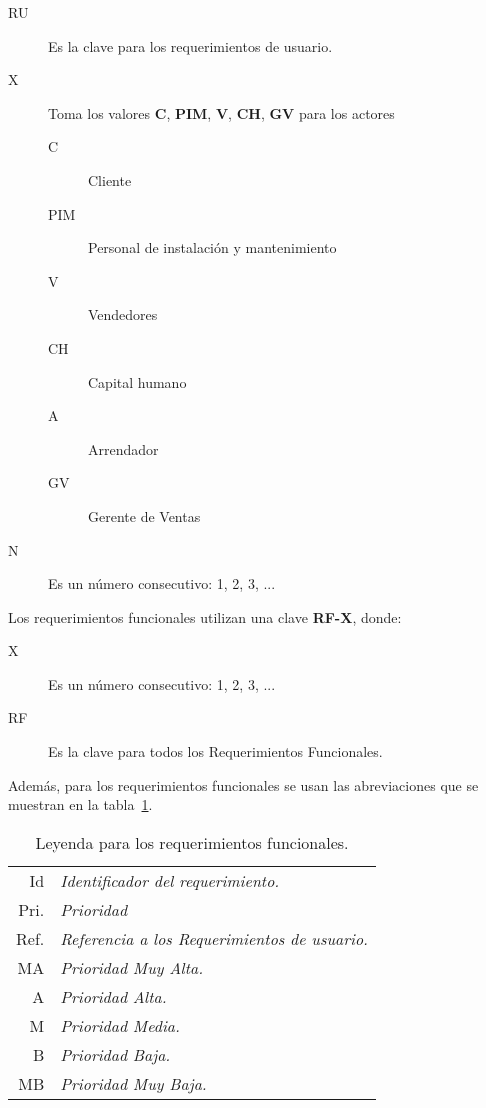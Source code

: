 \begin{description}
    \item[RU] Es la clave para los requerimientos de usuario.
	\item[X] Toma los valores \textbf{C}, \textbf{PIM}, \textbf{V}, \textbf{CH}, \textbf{GV} para los actores
	\begin{description}
	    \item[C] Cliente
	    \item[PIM] Personal de instalación y mantenimiento
	    \item[V] Vendedores
	    \item[CH] Capital humano
	    \item[A] Arrendador
	     \item[GV] Gerente de Ventas
	\end{description}
	\item[N] Es un número consecutivo: 1, 2, 3, ...
\end{description}
Los requerimientos funcionales utilizan una clave \textbf{RF-X}, donde:
\begin{description}
    \item[X] Es un número consecutivo: 1, 2, 3, ...
    \item[RF] Es la clave para todos los Requerimientos Funcionales.
\end{description}
	Además, para los requerimientos funcionales se usan las abreviaciones que se muestran en la tabla~\ref{tbl:leyendaRF}.
\begin{table}[hbtp!]
	\begin{center}
    \begin{tabular}{|r l|}
	    \hline
    	{\footnotesize Id} & {\footnotesize\em Identificador del requerimiento.}\\
    	{\footnotesize Pri.} & {\footnotesize\em Prioridad}\\
    	{\footnotesize Ref.} & {\footnotesize\em Referencia a los Requerimientos de usuario.}\\
    	{\footnotesize MA} & {\footnotesize\em Prioridad Muy Alta.}\\
    	{\footnotesize A} & {\footnotesize\em Prioridad Alta.}\\
    	{\footnotesize M} & {\footnotesize\em Prioridad Media.}\\
    	{\footnotesize B} & {\footnotesize\em Prioridad Baja.}\\
    	{\footnotesize MB} & {\footnotesize\em Prioridad Muy Baja.}\\
		\hline
    \end{tabular} 
    \caption{Leyenda para los requerimientos funcionales.}
    \label{tbl:leyendaRF}
	\end{center}
\end{table}